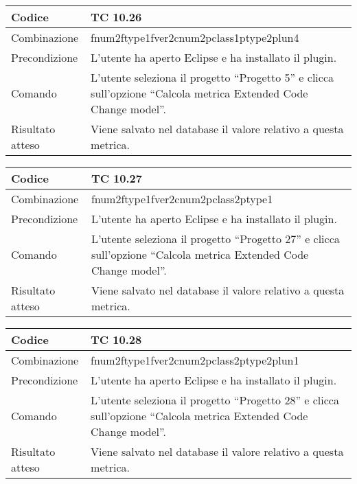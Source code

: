 \begin{table}[ht]
\begin{tabular}{|p{3cm}|p{9cm}|}
\hline
\cellcolor{lightgray}Codice				& TC 10.26								\\
\hline
\cellcolor{lightgray}Combinazione		& fnum2ftype1fver2cnum2pclass1ptype2plun4									\\
\hline
\cellcolor{lightgray}Precondizione		& L'utente ha aperto Eclipse e ha installato il plugin.		\\
\hline
\cellcolor{lightgray}Comando			& L'utente seleziona il progetto ``Progetto 5''  e clicca sull'opzione ``Calcola metrica Extended Code Change model''.	\\
\hline
\cellcolor{lightgray}Risultato atteso	& Viene salvato nel database il valore relativo a questa metrica.\\
\hline
\end{tabular}
\end{table}


\begin{table}[ht]
\begin{tabular}{|p{3cm}|p{9cm}|}
\hline
\cellcolor{lightgray}Codice				& TC 10.27								\\
\hline
\cellcolor{lightgray}Combinazione		& fnum2ftype1fver2cnum2pclass2ptype1									\\
\hline
\cellcolor{lightgray}Precondizione		& L'utente ha aperto Eclipse e ha installato il plugin.		\\
\hline
\cellcolor{lightgray}Comando			& L'utente seleziona il progetto ``Progetto 27''  e clicca sull'opzione ``Calcola metrica Extended Code Change model''.	\\
\hline
\cellcolor{lightgray}Risultato atteso	& Viene salvato nel database il valore relativo a questa metrica.\\
\hline
\end{tabular}
\end{table}

\begin{table}[ht]
\begin{tabular}{|p{3cm}|p{9cm}|}
\hline
\cellcolor{lightgray}Codice				& TC 10.28								\\
\hline
\cellcolor{lightgray}Combinazione		& fnum2ftype1fver2cnum2pclass2ptype2plun1									\\
\hline
\cellcolor{lightgray}Precondizione		& L'utente ha aperto Eclipse e ha installato il plugin.		\\
\hline
\cellcolor{lightgray}Comando			& L'utente seleziona il progetto ``Progetto 28''  e clicca sull'opzione ``Calcola metrica Extended Code Change model''.	\\
\hline
\cellcolor{lightgray}Risultato atteso	& Viene salvato nel database il valore relativo a questa metrica.\\
\hline
\end{tabular}
\end{table}

